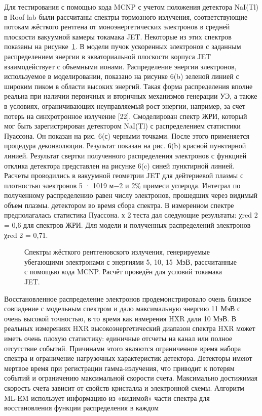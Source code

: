 Для тестирования с помощью кода MCNP с учетом положения детектора NaI(Tl) в Roof lab были рассчитаны спектры тормозного излучения, соответствующие потокам жёсткого рентгена от моноэнергетических электронов в средней плоскости вакуумной камеры токамака JET. Некоторые из этих спектров показаны на рисунке~\ref{fig:mcnpRunawayResponseJetSh2013}. В модели пучок ускоренных электронов с заданным распределением энергии в экваториальной плоскости корпуса JET взаимодействует с объемными ионами. Распределение энергии электронов, используемое в моделировании, показано на рисунке 6(b) зеленой линией с широким пиком в области высоких энергий. Такая форма распределения вполне реальна при наличии первичных и вторичных механизмов генерации УЭ, а также в условиях, ограничивающих неуправляемый рост энергии, например, за счет потерь на синхротронное излучение [22]. Смоделирован спектр ЖРИ, который мог быть зарегистрирован детектором NaI(Tl) с распределением статистики Пуассона. Он показан на рис. 6(с) черными точками. После этого применяется процедура деконволюции. Результат показан на рис. 6(b) красной пунктирной линией. Результат свертки полученного распределения электронов с функцией отклика детектора представлен на рисунке 6(c) синей пунктирной линией. Расчеты проводились в вакуумной геометрии JET для дейтериевой плазмы с плотностью электронов 5 · 1019 м−2 и 2\% примеси углерода. Интеграл по полученному распределению равен числу электронов, прошедших через видимый объем плазмы.
детектором во время сбора спектра. В измеренном спектре предполагалась статистика Пуассона. х 2 теста
дал следующие результаты: χred 2
 = 0,6 для спектров ЖРИ.
Для модели и полученных распределений электронов χred
 2
 = 0,71.

\begin{figure}[ht!]
  \caption{ Спектры жёсткого рентгеновского излучения, генерируемые убегающими электронами с энергиями 5, 10, 15~МэВ, рассчитанные с помощью кода MCNP. Расчёт проведён для условий токамака JET.~\cite{Shevelev2013} }
  \label{fig:mcnpRunawayResponseJetSh2013}
\end{figure}


Восстановленное распределение электронов продемонстрировало очень близкое совпадение с модельным спектром и дало максимальную энергию 11 МэВ с очень высокой точностью, в то время как измерения HXR дали 10 МэВ. В реальных измерениях HXR высокоэнергетический диапазон спектра HXR может иметь очень плохую статистику: единичные отсчеты на канал или полное отсутствие событий. Причинами этого являются ограниченное время набора спектра и ограничение нагрузочных характеристик детектора. Детекторы имеют мертвое время при регистрации гамма-излучения, что приводит к потерям событий и ограничению максимальной скорости счета. Максимально достижимая скорость счета зависит от свойств кристалла и электронной схемы. Алгоритм ML-EM использует информацию из «видимой» части спектра для восстановления функции распределения в каждом



\FloatBarrier
